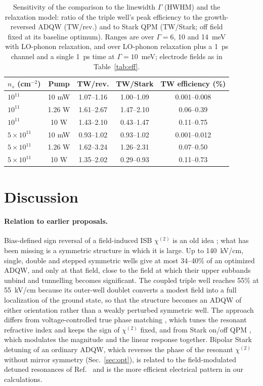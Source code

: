 \documentclass[11pt]{article}
\newcommand{\chitwo}{\chi^{(2)}}
\begin{document}
\begin{table}[t]
\centering\small
\caption{Sensitivity of the comparison to the linewidth $\Gamma$ (HWHM) and the relaxation model: ratio of the triple well's peak efficiency to the growth-reversed ADQW (TW/rev.) and to Stark QPM (TW/Stark; off field fixed at its baseline optimum). Ranges are over $\Gamma=6$, 10 and 14~meV with LO-phonon relaxation, and over LO-phonon relaxation plus a 1~ps channel and a single 1~ps time at $\Gamma=10$~meV; electrode fields as in Table~\ref{tab:eff}.}\label{tab:sens}
\begin{tabular}{@{}lcccc@{}}
\toprule
$n_s$ (cm$^{-2}$) & Pump & TW/rev. & TW/Stark & TW efficiency (\%) \\ \midrule
$10^{11}$ & 10 mW & 1.07--1.16 & 1.00--1.09 & 0.001--0.008 \\
$10^{11}$ & 1.26 W & 1.61--2.67 & 1.47--2.10 & 0.06--0.39 \\
$10^{11}$ & 10 W & 1.43--2.10 & 0.43--1.47 & 0.11--0.75 \\
$5\times10^{11}$ & 10 mW & 0.93--1.02 & 0.93--1.02 & 0.001--0.012 \\
$5\times10^{11}$ & 1.26 W & 1.62--3.24 & 1.26--2.31 & 0.07--0.50 \\
$5\times10^{11}$ & 10 W & 1.35--2.02 & 0.29--0.93 & 0.11--0.73 \\ \bottomrule
\end{tabular}
\end{table}

\section{Discussion}
\paragraph{Relation to earlier proposals.} Bias-defined sign reversal of a field-induced ISB $\chitwo$ is an old idea \cite{Patent4880297,Patent5289309}; what has been missing is a symmetric structure in which it is large. Up to 140~kV/cm, single, double and stepped symmetric wells give at most 34--40\% of an optimized ADQW, and only at that field, close to the field at which their upper subbands unbind and tunnelling becomes significant. The coupled triple well reaches 55\% at 55~kV/cm because its outer-well doublet converts a modest field into a full localization of the ground state, so that the structure becomes an ADQW of either orientation rather than a weakly perturbed symmetric well. The approach differs from voltage-controlled true phase matching \cite{Meyer1995APL}, which tunes the resonant refractive index and keeps the sign of $\chitwo$ fixed, and from Stark on/off QPM \cite{Belkin2006}, which modulates the magnitude and the linear response together. Bipolar Stark detuning of an ordinary ADQW, which reverses the phase of the resonant $\chitwo$ without mirror symmetry (Sec.~\ref{sec:opt}), is related to the field-modulated detuned resonances of Ref.~\cite{Vurgaftman1996SSC} and is the more efficient electrical pattern in our calculations.
\end{document}
